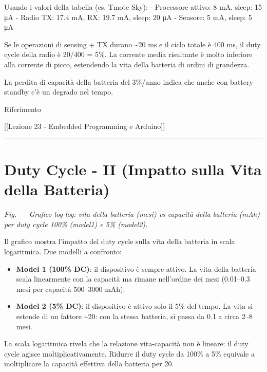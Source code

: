 \documentclass[
  italian,
  openany]{book}
\providecommand{\tightlist}{%
  \setlength{\itemsep}{0pt}\setlength{\parskip}{0pt}}
\begin{document}
Usando i valori della tabella (es. Tmote Sky): - Processore attivo: 8
mA, sleep: 15 μA - Radio TX: 17.4 mA, RX: 19.7 mA, sleep: 20 μA -
Sensore: 5 mA, sleep: 5 μA

Se le operazioni di sensing + TX durano \textasciitilde20 ms e il ciclo
totale è 400 ms, il duty cycle della radio è 20/400 = 5\%. La corrente
media risultante è molto inferiore alla corrente di picco, estendendo la
vita della batteria di ordini di grandezza.

La perdita di capacità della batteria del 3\%/anno indica che anche con
battery standby c'è un degrado nel tempo.

\begin{calloutnote}{Riferimento}

{[}{[}Lezione 23 - Embedded Programming e Arduino{]}{]}

\end{calloutnote}

\begin{center}\rule{0.5\linewidth}{0.5pt}\end{center}

\section{Duty Cycle - II (Impatto sulla Vita della
Batteria)}\label{duty-cycle---ii-impatto-sulla-vita-della-batteria}

\emph{Fig. --- Grafico log-log: vita della batteria (mesi) vs capacità
della batteria (mAh) per duty cycle 100\% (model1) e 5\% (model2).}

Il grafico mostra l'impatto del duty cycle sulla vita della batteria in
scala logaritmica. Due modelli a confronto:

\begin{itemize}
\tightlist
\item
  \textbf{Model 1 (100\% DC)}: il dispositivo è sempre attivo. La vita
  della batteria scala linearmente con la capacità ma rimane nell'ordine
  dei mesi (0.01--0.3 mesi per capacità 500--3000 mAh).
\item
  \textbf{Model 2 (5\% DC)}: il dispositivo è attivo solo il 5\% del
  tempo. La vita si estende di un fattore \textasciitilde20: con la
  stessa batteria, si passa da 0.1 a circa 2--8 mesi.
\end{itemize}

La scala logaritmica rivela che la relazione vita-capacità non è
lineare: il duty cycle agisce moltiplicativamente. Ridurre il duty cycle
da 100\% a 5\% equivale a moltiplicare la capacità effettiva della
batteria per 20.
\end{document}

